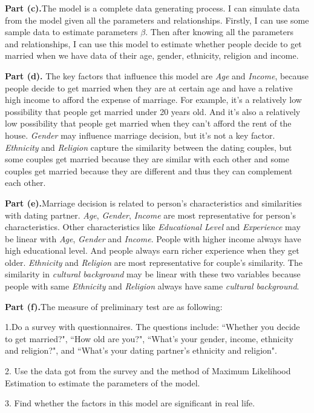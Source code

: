 \documentclass[letterpaper,12pt]{article}
\theoremstyle{definition}
\begin{document}
\textbf{Part (c).}The model is a complete data generating process. I can simulate data from the model given all the parameters and relationships. Firstly, I can use some sample data to estimate parameters $\beta$. Then after knowing all the parameters and relationships, I can use this model to estimate whether people decide to get married when we have data of their age, gender, ethnicity, religion and income.

\textbf{Part (d).} The key factors that influence this model are \emph{Age} and \emph{Income}, because people decide to get married when they are at certain age and have a relative high income to afford the expense of marriage. For example, it's a relatively low possibility that people get married under 20 years old. And it's also a relatively low possibility that people get married when they can't afford the rent of the house. \emph{Gender} may influence marriage decision, but it's not a key factor. \emph{Ethnicity} and \emph{Religion} capture the similarity between the dating couples, but some couples get married because they are similar with each other and some couples get married because they are different and thus they can complement each other.

\textbf{Part (e).}Marriage decision is related to person's characteristics and similarities with dating partner. \emph{Age}, \emph{Gender}, \emph{Income} are most representative for person's characteristics. Other characteristics like \emph{Educational Level} and \emph{Experience}  may be linear with \emph{Age}, \emph{Gender} and \emph{Income}. People with higher income always have high educational level. And people always earn richer experience when they get older. \emph{Ethnicity} and \emph{Religion} are most representative for couple's similarity. The similarity in \emph{cultural background} may be linear with these two variables because people with same \emph{Ethnicity} and \emph{Religion} always have same \emph{cultural background}. 

\textbf{Part (f).}The measure  of preliminary test are as following:

 1.Do a survey with questionnaires. The questions include: ``Whether you decide to get married?", ``How old are you?", ``What's your gender, income, ethnicity and religion?", and ``What's your dating partner's ethnicity and religion".
 
2. Use the data got from the survey and the method of Maximum Likelihood Estimation to estimate the parameters of the model.

3. Find whether the factors in this model are significant in real life. 
\end{document}
